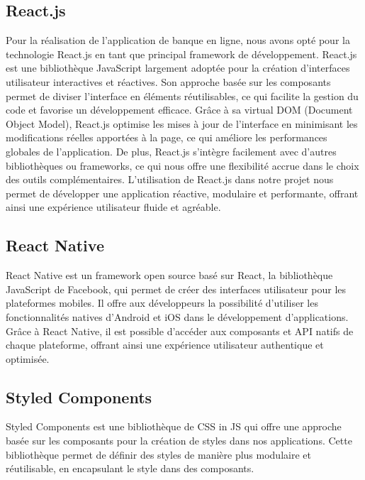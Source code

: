 \subsection*{React.js}
Pour la réalisation de l'application de banque en ligne, nous avons opté pour la technologie React.js en tant que principal framework de développement. React.js est une bibliothèque JavaScript largement adoptée pour la création d'interfaces utilisateur interactives et réactives. Son approche basée sur les composants permet de diviser l'interface en éléments réutilisables, ce qui facilite la gestion du code et favorise un développement efficace. Grâce à sa virtual DOM (Document Object Model), React.js optimise les mises à jour de l'interface en minimisant les modifications réelles apportées à la page, ce qui améliore les performances globales de l'application. De plus, React.js s'intègre facilement avec d'autres bibliothèques ou frameworks, ce qui nous offre une flexibilité accrue dans le choix des outils complémentaires. L'utilisation de React.js dans notre projet nous permet de développer une application réactive, modulaire et performante, offrant ainsi une expérience utilisateur fluide et agréable.

\subsection*{React Native}
React Native est un framework open source basé sur React, la bibliothèque JavaScript de Facebook, qui permet de créer des interfaces utilisateur pour les plateformes mobiles. Il offre aux développeurs la possibilité d'utiliser les fonctionnalités natives d'Android et iOS dans le développement d'applications. Grâce à React Native, il est possible d'accéder aux composants et API natifs de chaque plateforme, offrant ainsi une expérience utilisateur authentique et optimisée.

\subsection*{Styled Components}
Styled Components est une bibliothèque de CSS in JS qui offre une approche basée sur les composants pour la création de styles dans nos applications. Cette bibliothèque permet de définir des styles de manière plus modulaire et réutilisable, en encapsulant le style dans des composants.\\

